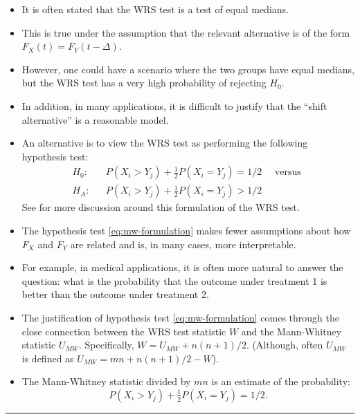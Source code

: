 \documentclass[]{book}
\begin{document}
\begin{itemize}
\item
  It is often stated that the WRS test is a test
  of equal medians.
\item
  This is true under the assumption that the
  relevant alternative is of the form \(F_{X}(t) = F_{Y}(t - \Delta)\).
\item
  However, one could have a scenario where the two groups have equal medians, but
  the WRS test has a very high probability of rejecting \(H_{0}\).
\item
  In addition, in many applications, it is difficult to justify
  that the ``shift alternative'' is a reasonable model.
\item
  An alternative is to view the WRS test as performing the following
  hypothesis test:
  \begin{eqnarray}
  H_{0}: && P(X_{i} > Y_{j}) + \tfrac{1}{2}P(X_{i} = Y_{j}) = 1/2 \quad \textrm{ versus } \\
  H_{A}: && P(X_{i} > Y_{j}) + \tfrac{1}{2}P(X_{i} = Y_{j}) > 1/2
  \label{eq:mw-formulation}
  \end{eqnarray}
  See \citet{divine2018} for more discussion around this formulation of the
  WRS test.
\item
  The hypothesis test \eqref{eq:mw-formulation} makes fewer assumptions
  about how \(F_{X}\) and \(F_{Y}\) are related and is, in many cases, more interpretable.
\item
  For example, in medical applications, it is often more natural to
  answer the question: what is the probability that the outcome
  under treatment 1 is better than the outcome under treatment 2.
\item
  The justification of hypothesis test \eqref{eq:mw-formulation} comes through
  the close connection between the WRS test statistic \(W\) and the Mann-Whitney statistic \(U_{MW}\).
  Specifically, \(W = U_{MW} + n(n+1)/2\). (Although, often \(U_{MW}\) is defined as
  \(U_{MW} = mn + n(n+1)/2 - W\)).
\item
  The Mann-Whitney statistic divided by \(mn\) is an estimate of the probability:
  \begin{equation}
  P(X_{i} > Y_{j}) + \tfrac{1}{2}P(X_{i} = Y_{j}) = 1/2.
  \end{equation}
\end{itemize}

\begin{center}\rule{0.5\linewidth}{\linethickness}\end{center}
\end{document}
